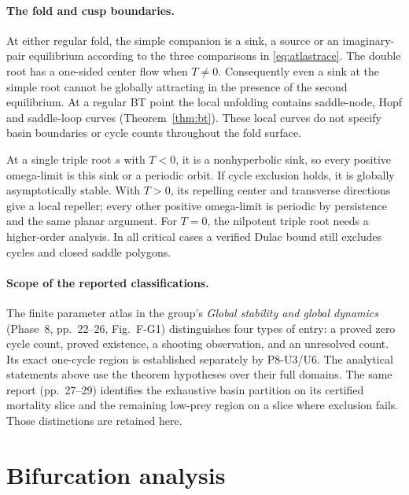 \documentclass[12pt,a4paper,twoside,fleqn]{article}
\theoremstyle{journal}
\begin{document}
\paragraph{The fold and cusp boundaries.}
At either regular fold, the simple companion is a sink, a source or an imaginary-pair equilibrium according to the three comparisons in \eqref{eq:atlastrace}. The double root has a one-sided center flow when \(T\ne0\). Consequently even a sink at the simple root cannot be globally attracting in the presence of the second equilibrium. At a regular BT point the local unfolding contains saddle-node, Hopf and saddle-loop curves (Theorem~\ref{thm:bt}). These local curves do not specify basin boundaries or cycle counts throughout the fold surface.

At a single triple root \(s\) with \(T<0\), it is a nonhyperbolic sink, so every positive omega-limit is this sink or a periodic orbit. If cycle exclusion holds, it is globally asymptotically stable. With \(T>0\), its repelling center and transverse directions give a local repeller; every other positive omega-limit is periodic by persistence and the same planar argument. For \(T=0\), the nilpotent triple root needs a higher-order analysis. In all critical cases a verified Dulac bound still excludes cycles and closed saddle polygons.

\paragraph{Scope of the reported classifications.}
The finite parameter atlas in the group's \emph{Global stability and global dynamics} (Phase~8, pp.~22--26, Fig.~F-G1) distinguishes four types of entry: a proved zero cycle count, proved existence, a shooting observation, and an unresolved count. Its exact one-cycle region is established separately by P8-U3/U6. The analytical statements above use the theorem hypotheses over their full domains. The same report (pp.~27--29) identifies the exhaustive basin partition on its certified mortality slice and the remaining low-prey region on a slice where exclusion fails. Those distinctions are retained here.

\section{Bifurcation analysis}\label{sec:bif}
\end{document}
